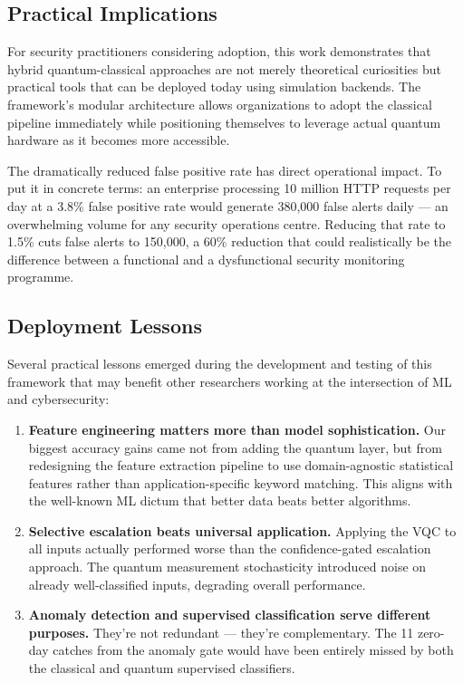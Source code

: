 \documentclass[journal,onecolumn]{IEEEtran}
\begin{document}
\subsection{Practical Implications}
For security practitioners considering adoption, this work demonstrates that hybrid quantum-classical approaches are not merely theoretical curiosities but practical tools that can be deployed today using simulation backends. The framework's modular architecture allows organizations to adopt the classical pipeline immediately while positioning themselves to leverage actual quantum hardware as it becomes more accessible.

The dramatically reduced false positive rate has direct operational impact. To put it in concrete terms: an enterprise processing 10 million HTTP requests per day at a 3.8\% false positive rate would generate 380,000 false alerts daily --- an overwhelming volume for any security operations centre. Reducing that rate to 1.5\% cuts false alerts to 150,000, a 60\% reduction that could realistically be the difference between a functional and a dysfunctional security monitoring programme.

\subsection{Deployment Lessons}
Several practical lessons emerged during the development and testing of this framework that may benefit other researchers working at the intersection of ML and cybersecurity:

\begin{enumerate}
\item[(a)] \textbf{Feature engineering matters more than model sophistication.} Our biggest accuracy gains came not from adding the quantum layer, but from redesigning the feature extraction pipeline to use domain-agnostic statistical features rather than application-specific keyword matching. This aligns with the well-known ML dictum that better data beats better algorithms.

\item[(b)] \textbf{Selective escalation beats universal application.} Applying the VQC to all inputs actually performed worse than the confidence-gated escalation approach. The quantum measurement stochasticity introduced noise on already well-classified inputs, degrading overall performance.

\item[(c)] \textbf{Anomaly detection and supervised classification serve different purposes.} They're not redundant --- they're complementary. The 11 zero-day catches from the anomaly gate would have been entirely missed by both the classical and quantum supervised classifiers.
\end{enumerate}
\end{document}

